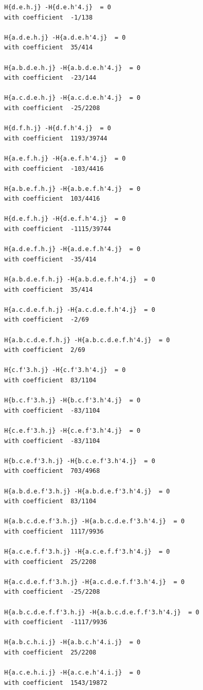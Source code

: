 \documentclass[11pt, a4paper]{kybernetika}
\begin{document}
\begin{verbatim}
		H{d.e.h.j} -H{d.e.h'4.j}  = 0
		with coefficient  -1/138
		
		H{a.d.e.h.j} -H{a.d.e.h'4.j}  = 0
		with coefficient  35/414
		
		H{a.b.d.e.h.j} -H{a.b.d.e.h'4.j}  = 0
		with coefficient  -23/144
		
		H{a.c.d.e.h.j} -H{a.c.d.e.h'4.j}  = 0
		with coefficient  -25/2208
		
		H{d.f.h.j} -H{d.f.h'4.j}  = 0
		with coefficient  1193/39744
		
		H{a.e.f.h.j} -H{a.e.f.h'4.j}  = 0
		with coefficient  -103/4416
		
		H{a.b.e.f.h.j} -H{a.b.e.f.h'4.j}  = 0
		with coefficient  103/4416
		
		H{d.e.f.h.j} -H{d.e.f.h'4.j}  = 0
		with coefficient  -1115/39744
		
		H{a.d.e.f.h.j} -H{a.d.e.f.h'4.j}  = 0
		with coefficient  -35/414
		
		H{a.b.d.e.f.h.j} -H{a.b.d.e.f.h'4.j}  = 0
		with coefficient  35/414
		
		H{a.c.d.e.f.h.j} -H{a.c.d.e.f.h'4.j}  = 0
		with coefficient  -2/69
		
		H{a.b.c.d.e.f.h.j} -H{a.b.c.d.e.f.h'4.j}  = 0
		with coefficient  2/69
		
		H{c.f'3.h.j} -H{c.f'3.h'4.j}  = 0
		with coefficient  83/1104
		
		H{b.c.f'3.h.j} -H{b.c.f'3.h'4.j}  = 0
		with coefficient  -83/1104
		
		H{c.e.f'3.h.j} -H{c.e.f'3.h'4.j}  = 0
		with coefficient  -83/1104
		
		H{b.c.e.f'3.h.j} -H{b.c.e.f'3.h'4.j}  = 0
		with coefficient  703/4968
		
		H{a.b.d.e.f'3.h.j} -H{a.b.d.e.f'3.h'4.j}  = 0
		with coefficient  83/1104
		
		H{a.b.c.d.e.f'3.h.j} -H{a.b.c.d.e.f'3.h'4.j}  = 0
		with coefficient  1117/9936
		
		H{a.c.e.f.f'3.h.j} -H{a.c.e.f.f'3.h'4.j}  = 0
		with coefficient  25/2208
		
		H{a.c.d.e.f.f'3.h.j} -H{a.c.d.e.f.f'3.h'4.j}  = 0
		with coefficient  -25/2208
		
		H{a.b.c.d.e.f.f'3.h.j} -H{a.b.c.d.e.f.f'3.h'4.j}  = 0
		with coefficient  -1117/9936
		
		H{a.b.c.h.i.j} -H{a.b.c.h'4.i.j}  = 0
		with coefficient  25/2208
		
		H{a.c.e.h.i.j} -H{a.c.e.h'4.i.j}  = 0
		with coefficient  1543/19872
		

\end{verbatim}
\end{document}
